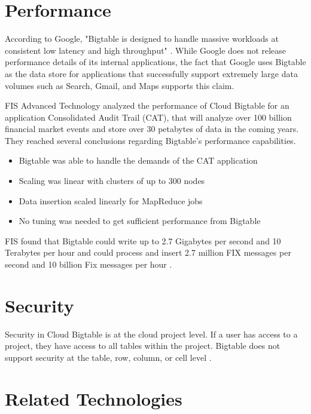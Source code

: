 \documentclass[9pt,twocolumn,twoside]{styles/osajnl}
\begin{document}
\section{Performance}

According to Google, "Bigtable is designed to handle massive workloads at consistent low latency and high throughput" \cite{www-cloudbigtable}.  While Google does not release performance details of its internal applications, the fact that Google uses Bigtable as the data store for applications that successfully support extremely large data volumes such as Search, Gmail, and Maps supports this claim.

FIS Advanced Technology analyzed the performance of Cloud Bigtable for an application Consolidated Audit Trail (CAT), that will analyze over 100 billion financial market events and store over 30 petabytes of data in the coming years.  They reached several conclusions regarding Bigtable's performance capabilities.
\begin{itemize}
\item Bigtable was able to handle the demands of the CAT application 
\item Scaling was linear with clusters of up to 300 nodes 
\item Data insertion scaled linearly for MapReduce jobs 
\item No tuning was needed to get sufficient performance from Bigtable
\end{itemize}

FIS found that Bigtable could write up to 2.7 Gigabytes per second and 10 Terabytes per hour and could process and insert 2.7 million FIX messages per second and 10 billion Fix messages per hour \cite{www-fis}.

\section{Security}

Security in Cloud Bigtable is at the cloud project level. If a user has access to a project, they have access to all tables within the project. Bigtable does not support security at the table, row, column, or cell level \cite{www-bigtabledocoverview}.

\section{Related Technologies}
\end{document}
